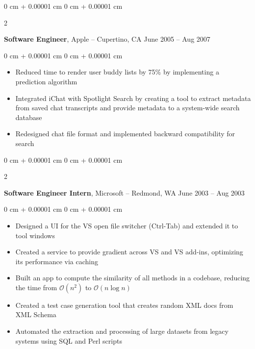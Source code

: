 \documentclass[10pt, letterpaper]{article}
\newenvironment{highlights}{
    \begin{itemize}[
        topsep=0.10 cm,
        parsep=0.10 cm,
        partopsep=0pt,
        itemsep=0pt,
        leftmargin=0 cm + 10pt
    ]
}{
    \end{itemize}
} %
\newenvironment{onecolentry}{
    \begin{adjustwidth}{
        0 cm + 0.00001 cm
    }{
        0 cm + 0.00001 cm
    }
}{
    \end{adjustwidth}
} %
\newenvironment{twocolentry}[2][]{
    \onecolentry
    \def\secondColumn{#2}
    \setcolumnwidth{\fill, 4.5 cm}
    \begin{paracol}{2}
}{
    \switchcolumn \raggedleft \secondColumn
    \end{paracol}
    \endonecolentry
} %
\begin{document}
	        
	\begin{twocolentry}{
			June 2005 – Aug 2007
		}
		\textbf{Software Engineer}, Apple -- Cupertino, CA\end{twocolentry}
		
		\vspace{0.10 cm}
		\begin{onecolentry}
			\begin{highlights}
				\item Reduced time to render user buddy lists by 75\% by implementing a prediction algorithm
				\item Integrated iChat with Spotlight Search by creating a tool to extract metadata from saved chat transcripts and provide metadata to a system-wide search database
				\item Redesigned chat file format and implemented backward compatibility for search
			\end{highlights}
		\end{onecolentry}
		
		
		\vspace{0.2 cm}
		
		\begin{twocolentry}{
				June 2003 – Aug 2003
			}
			\textbf{Software Engineer Intern}, Microsoft -- Redmond, WA\end{twocolentry}
			
			\vspace{0.10 cm}
			\begin{onecolentry}
				\begin{highlights}
					\item Designed a UI for the VS open file switcher (Ctrl-Tab) and extended it to tool windows
					\item Created a service to provide gradient across VS and VS add-ins, optimizing its performance via caching
					\item Built an app to compute the similarity of all methods in a codebase, reducing the time from $\mathcal{O}(n^2)$ to $\mathcal{O}(n \log n)$
					\item Created a test case generation tool that creates random XML docs from XML Schema
					\item Automated the extraction and processing of large datasets from legacy systems using SQL and Perl scripts
				\end{highlights}
			\end{onecolentry}
			
			
			
\end{document}

